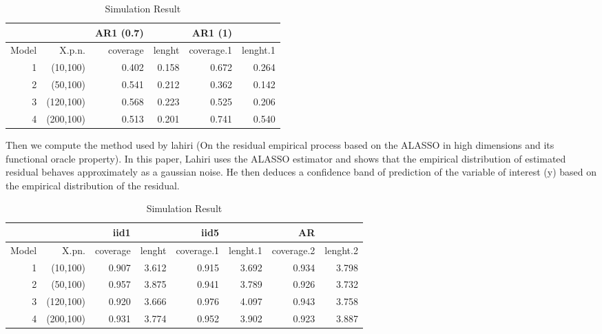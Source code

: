 \documentclass[11pt,oneside, a4paper]{amsart}\usepackage[]{graphicx}\usepackage[]{color}
\begin{document}
\begin{table}[ht]
\centering
\caption{Simulation Result} 
\label{Test_table}
{\footnotesize
\begin{tabular}{|r|r|rr|rr|}
  \toprule 
    &  & AR1 (0.7) &  & AR1 (1) &  \\
 \midrule 
Model & X.p.n. & coverage & lenght & coverage.1 & lenght.1 \\ 
    1 & (10,100) & 0.402 & 0.158 & 0.672 & 0.264 \\ 
     2 & (50,100) & 0.541 & 0.212 & 0.362 & 0.142 \\ 
     3 & (120,100) & 0.568 & 0.223 & 0.525 & 0.206 \\ 
     4 & (200,100) & 0.513 & 0.201 & 0.741 & 0.540 \\ 
   \bottomrule 
\end{tabular}
}
\end{table}








Then we compute the method used by lahiri (On the residual empirical process based on the ALASSO in high dimensions and its functional oracle property). In this paper, Lahiri uses the ALASSO estimator and shows that the empirical distribution of estimated residual behaves approximately as a gaussian noise. He then deduces a confidence band of prediction of the variable of interest (y) based on the empirical distribution of the residual.




\begin{table}[ht]
\centering
\caption{Simulation Result} 
\label{Test_table}
{\footnotesize
\begin{tabular}{|r|r|rr|rr|rr|}
  \toprule 
    &  & iid1 &  & iid5 & & AR & \\
 \midrule 
Model & X.pn. & coverage & lenght & coverage.1 & lenght.1 & coverage.2 & lenght.2 \\ 
    1 & (10,100) & 0.907 & 3.612 & 0.915 & 3.692 & 0.934 & 3.798 \\ 
     2 & (50,100) & 0.957 & 3.875 & 0.941 & 3.789 & 0.926 & 3.732 \\ 
     3 & (120,100) & 0.920 & 3.666 & 0.976 & 4.097 & 0.943 & 3.758 \\ 
     4 & (200,100) & 0.931 & 3.774 & 0.952 & 3.902 & 0.923 & 3.887 \\ 
   \bottomrule 
\end{tabular}
}
\end{table}
\end{document}
